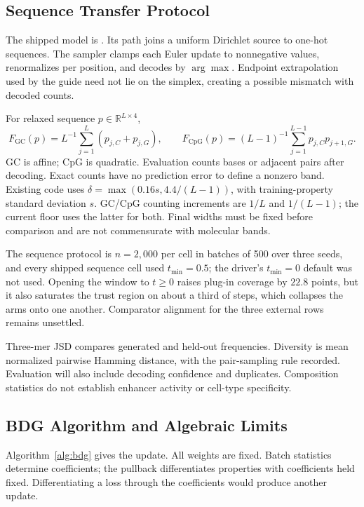 \documentclass{article}
\begin{document}
\subsection{Sequence Transfer Protocol}\label{app:m2}
The shipped model is . Its path joins a uniform Dirichlet source to one-hot sequences. The sampler clamps each Euler update to nonnegative values, renormalizes per position, and decodes by $\arg\max$. Endpoint extrapolation used by the guide need not lie on the simplex, creating a possible mismatch with decoded counts.

For relaxed sequence $p\in\mathbb R^{L\times4}$,
\[
F_{\mathrm{GC}}(p)=L^{-1}\sum_{j=1}^L(p_{j,C}+p_{j,G}),\qquad
F_{\mathrm{CpG}}(p)=(L-1)^{-1}\sum_{j=1}^{L-1}p_{j,C}p_{j+1,G}.
\]
GC is affine; CpG is quadratic. Evaluation counts bases or adjacent pairs after decoding. Exact counts have no prediction error to define a nonzero band. Existing code uses $\delta=\max(0.16s,4.4/(L-1))$, with training-property standard deviation $s$. GC/CpG counting increments are $1/L$ and $1/(L-1)$; the current floor uses the latter for both. Final widths must be fixed before comparison and are not commensurate with molecular bands.

The sequence protocol is $n=2{,}000$ per cell in batches of 500 over three seeds, and every shipped sequence cell used $t_{\min}=0.5$; the driver's $t_{\min}=0$ default was not used. Opening the window to $t\ge0$ raises plug-in coverage by $22.8$ points, but it also saturates the trust region on about a third of steps, which collapses the arms onto one another. Comparator alignment for the three external rows remains unsettled.

Three-mer JSD compares generated and held-out frequencies. Diversity is mean normalized pairwise Hamming distance, with the pair-sampling rule recorded. Evaluation will also include decoding confidence and duplicates. Composition statistics do not establish enhancer activity or cell-type specificity.

\subsection{BDG Algorithm and Algebraic Limits}\label{app:algebra}
Algorithm~\ref{alg:bdg} gives the update. All weights are fixed. Batch statistics determine coefficients; the pullback differentiates properties with coefficients held fixed. Differentiating a loss through the coefficients would produce another update.
\end{document}
